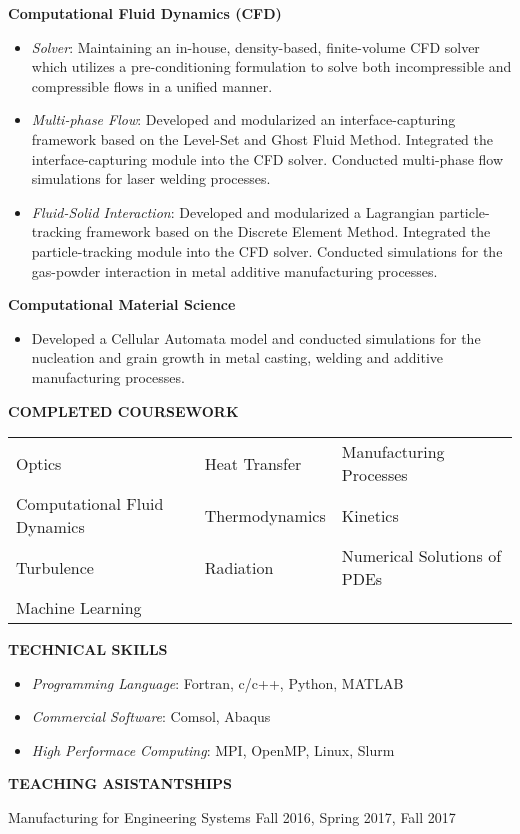 \documentclass[11pt, letterpaper]{article}
\begin{document}
\fullrule
\textbf{Computational Fluid Dynamics (CFD)}
\begin{itemize}[leftmargin=*, labelsep=5mm]
   \item \textit{Solver}: Maintaining an in-house, density-based, finite-volume CFD solver which utilizes a pre-conditioning formulation to solve both incompressible and compressible flows in a unified manner. 
   \item \textit{Multi-phase Flow}: Developed and modularized an interface-capturing framework based on the Level-Set and Ghost Fluid Method. Integrated the interface-capturing module into the CFD solver. Conducted multi-phase flow simulations for laser welding processes.
   \item \textit{Fluid-Solid Interaction}: Developed and modularized a Lagrangian particle-tracking framework based on the Discrete Element Method. Integrated the particle-tracking module into the CFD solver. Conducted simulations for the gas-powder interaction in metal additive manufacturing processes.
\end{itemize}

\vspace{3pt}
\textbf{Computational Material Science}
\begin{itemize}[leftmargin=*, labelsep=5mm]
   \item Developed a Cellular Automata model and conducted simulations for the nucleation and grain growth in metal casting, welding and additive manufacturing processes.
\end{itemize}
\vspace{-3pt}
\paraspace
\textbf{COMPLETED COURSEWORK}

\fullrule
\vspace{3pt}
\begin{tabular}{@{} p{} p{} p{} @{}}
   Optics & Heat Transfer & Manufacturing Processes \\
   Computational Fluid Dynamics & Thermodynamics & Kinetics \\
   Turbulence & Radiation & Numerical Solutions of PDEs \\
   Machine Learning & & 
\end{tabular}

\paraspace
\textbf{TECHNICAL SKILLS}

\fullrule

\begin{itemize}[leftmargin=*, labelsep=3mm, itemsep=2pt, topsep=0pt]
   \item \textit{Programming Language}: Fortran, c/c++, Python, MATLAB
   \item \textit{Commercial Software}: Comsol, Abaqus
   \item \textit{High Performace Computing}: MPI, OpenMP, Linux, Slurm
\end{itemize}

\paraspace
\textbf{TEACHING ASISTANTSHIPS}

\fullrule
Manufacturing for Engineering Systems \hfill Fall 2016, Spring 2017, Fall 2017
\end{document}
